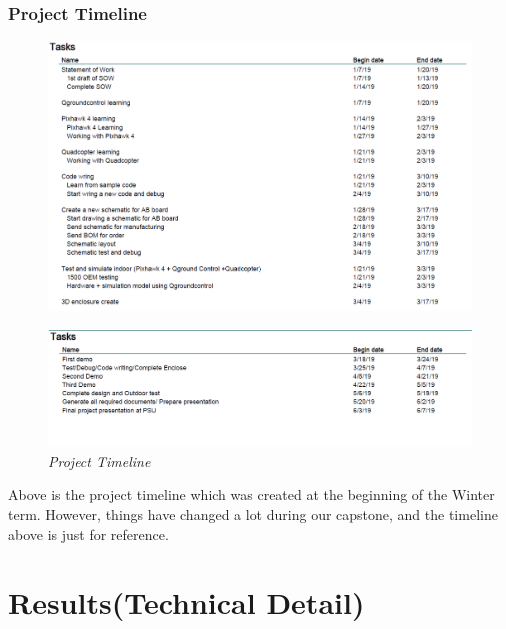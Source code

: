 \documentclass[11pt]{article}
\begin{document}
\subsubsection{Project Timeline}

\begin{figure}[h!bt]
\centering	
\includegraphics[width=7 in]{timeline1}
\end{figure}

\begin{figure}[h!bt]
\centering	
\includegraphics[width=7 in]{timeline2}
\caption{\textit{Project Timeline}}	
\end{figure} 
\break

Above is the project timeline which was created at the beginning of the Winter term. However, things have changed a lot during our capstone, and the timeline above is just for reference.



\section{Results(Technical Detail)}
\end{document}
